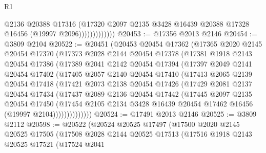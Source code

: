 \begin{lexlean}{R1}
\begin{coremodule}
                          @2136
                          @20388
                          @17316
                          (@17320
                            @2097
                            @2135
                            @3428
                            @16439
                            @20388
                            @17328
                            @16456
                            (@19997 @2096)))))))))))))
@20453 := @17356 @2013 @2146
@20454 := @3809 @2104
@20522 := @20451
    (@20453
      @20454
      @17362
      (@17365
        @2020
        @2145
        @20454
        @17370
        (@17373
          @2028
          @2144
          @20454
          @17378
          (@17381
            @1918
            @2143
            @20454
            @17386
            (@17389
              @2041
              @2142
              @20454
              @17394
              (@17397
                @2049
                @2141
                @20454
                @17402
                (@17405
                  @2057
                  @2140
                  @20454
                  @17410
                  (@17413
                    @2065
                    @2139
                    @20454
                    @17418
                    (@17421
                      @2073
                      @2138
                      @20454
                      @17426
                      (@17429
                        @2081
                        @2137
                        @20454
                        @17434
                        (@17437
                          @2089
                          @2136
                          @20454
                          @17442
                          (@17445
                            @2097
                            @2135
                            @20454
                            @17450
                            (@17454
                              @2105
                              @2134
                              @3428
                              @16439
                              @20454
                              @17462
                              @16456
                              (@19997 @2104))))))))))))))
@20524 := @17491 @2013 @2146
@20525 := @3809 @2112
@20598 := @20522
    (@20524
      @20525
      @17497
      (@17500
        @2020
        @2145
        @20525
        @17505
        (@17508
          @2028
          @2144
          @20525
          @17513
          (@17516
            @1918
            @2143
            @20525
            @17521
            (@17524
              @2041

\end{coremodule}
\end{lexlean}
